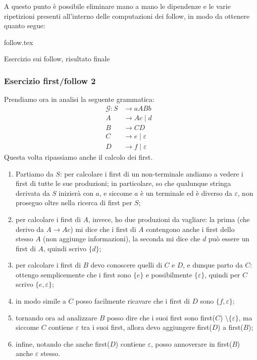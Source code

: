 \documentclass[class=book, crop=false, oneside, 12pt]{standalone}
\begin{document}
A questo punto è possibile eliminare mano a mano le dipendenze e le varie ripetizioni presenti all'interno delle computazioni dei follow, in modo da ottenere quanto segue: 

\begin{table}[H]
	\centering
	{follow.tex}
    \caption{Esercizio sui follow, risultato finale}
    \label{follow}
\end{table}

\subsubsection{Esercizio first/follow 2}
\label{first-folllow-ex-2}
Prendiamo ora in analisi la seguente grammatica:
\begin{align*}
       \mathcal{G}: S &\to aABb \\
       A &\to Ac \mid d \\
       B &\to CD \\
       C &\to e \mid \varepsilon \\
       D &\to f \mid \varepsilon
\end{align*}
Questa volta ripassiamo anche il calcolo dei first.
\begin{enumerate}
    \item Partiamo da \(S\): per calcolare i first di un non-terminale andiamo a vedere i first di tutte le sue produzioni; in particolare, so che qualunque stringa derivata da \(S\) inizierà con \(a\), e siccome \(a\) è un terminale ed è diverso da \(\varepsilon\), non proseguo oltre nella ricerca di first per \(S\);
    \item per calcolare i first di \(A\), invece, ho due produzioni da vagliare: la prima (che derivo da \(A \to Ac\)) mi dice che i first di \(A\) contengono anche i first dello stesso \(A\) (non aggiunge informazioni), la seconda mi dice che \(d\) può essere un first di \(A\), quindi scrivo \(\{d\}\);
    \item per calcolare i first di \(B\) devo conoscere quelli di \(C\) e \(D\), e dunque parto da \(C\): ottengo semplicemente che i first sono \(\{e\}\) e possibilmente \(\{\varepsilon\}\), quindi per \(C\) scrivo \(\{e, \varepsilon\}\);
    \item in modo simile a \(C\) posso facilmente ricavare che i first di \(D\) sono \(\{f, \varepsilon\}\);
    \item tornando ora ad analizzare \(B\) posso dire che i suoi first sono first(\(C\)) \( \setminus \{\varepsilon\}\), ma siccome \(C\) contiene \(\varepsilon\) tra i suoi first, allora devo aggiungere first(\(D\)) a first(\(B\));
    \item infine, notando che anche first(\(D\)) contiene \(\varepsilon\), posso annoverare in first(\(B\)) anche \(\varepsilon\) stesso.    
\end{enumerate}
\end{document}
